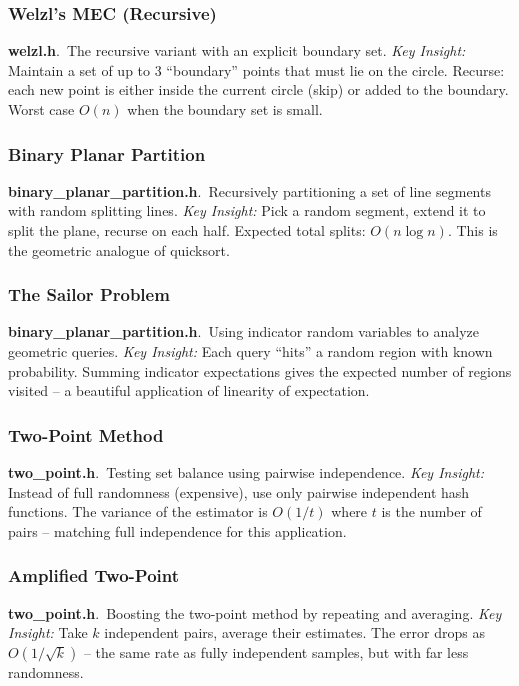 \documentclass[11pt,a4paper]{article}
\newcommand{\algo}[2]{\textbf{#1}.\ #2}
\newcommand{\insight}{\textit{Key Insight: }}
\begin{document}
\subsubsection{Welzl's MEC (Recursive)}
\algo{welzl.h}{The recursive variant with an explicit boundary set.}
\insight Maintain a set of up to 3 ``boundary'' points that must lie on the circle. Recurse: each new point is either inside the current circle (skip) or added to the boundary. Worst case \(O(n)\) when the boundary set is small.

\subsubsection{Binary Planar Partition}
\algo{binary\_planar\_partition.h}{Recursively partitioning a set of line segments with random splitting lines.}
\insight Pick a random segment, extend it to split the plane, recurse on each half. Expected total splits: \(O(n \log n)\). This is the geometric analogue of quicksort.

\subsubsection{The Sailor Problem}
\algo{binary\_planar\_partition.h}{Using indicator random variables to analyze geometric queries.}
\insight Each query ``hits'' a random region with known probability. Summing indicator expectations gives the expected number of regions visited -- a beautiful application of linearity of expectation.

\subsubsection{Two-Point Method}
\algo{two\_point.h}{Testing set balance using pairwise independence.}
\insight Instead of full randomness (expensive), use only pairwise independent hash functions. The variance of the estimator is \(O(1/t)\) where \(t\) is the number of pairs -- matching full independence for this application.

\subsubsection{Amplified Two-Point}
\algo{two\_point.h}{Boosting the two-point method by repeating and averaging.}
\insight Take \(k\) independent pairs, average their estimates. The error drops as \(O(1/\sqrt{k})\) -- the same rate as fully independent samples, but with far less randomness.
\end{document}
